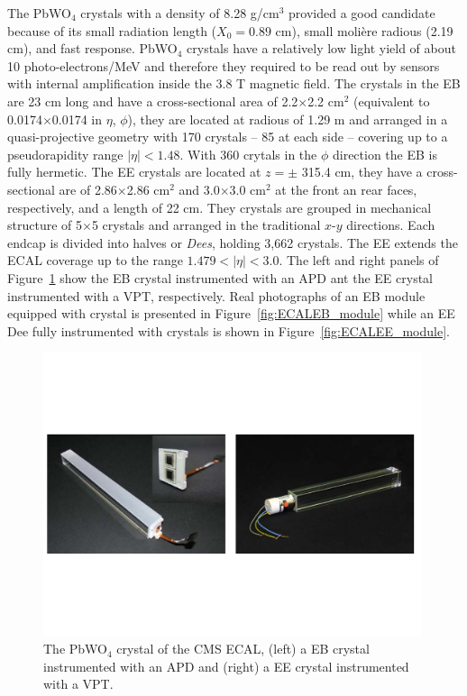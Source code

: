 The PbWO$_{4}$ crystals with a density of 8.28 g/cm$^{3}$ provided a
good candidate because of its small radiation length ($X_{0} = 0.89$
cm), small moli\`ere radious (2.19 cm), and fast response. PbWO$_{4}$
crystals have a relatively low light yield of about 10
photo-electrons/MeV and therefore they required to be read out by
sensors with internal amplification inside the 3.8 T magnetic
field. The crystals in the EB are 23 cm long and have a
cross-sectional area of 2.2$\times$2.2 cm$^{2}$ (equivalent to
0.0174$\times$0.0174 in $\eta$, $\phi$), they are located at radious
of 1.29 m and arranged
in a quasi-projective geometry with 170 crystals -- 85 at each side --  covering up to a pseudorapidity range
$|\eta| < 1.48$. With 360 crytals in the $\phi$  direction the EB is
fully hermetic. The EE crystals are located at $z = \pm$ 315.4 cm, they
have a cross-sectional are of 2.86$\times$2.86 cm$^{2}$  and
3.0$\times$3.0 cm$^{2}$ at the front an rear faces, respectively, and
a length of 22 cm. They crystals are grouped in mechanical structure
of 5$\times$5 crystals and arranged in the traditional $x$-$y$
directions. Each endcap is divided into halves or \textit{Dees},
holding 3,662 crystals. The EE extends the ECAL coverage up to the
range $1.479 < |\eta| < 3.0$. The left and right panels of
Figure~\ref{fig:ECALcrystals} show the EB crystal instrumented with an
APD ant the EE crystal instrumented with a VPT, respectively.  Real
photographs of an EB module equipped with crystal is presented in
Figure~\ref{fig:ECALEB_module} while an EE Dee fully instrumented with crystals is shown
in Figure~\ref{fig:ECALEE_module}.
\begin{figure}
 \centering
\includegraphics[width=0.99\textwidth]{CMS_DetectorFigures/EcalCrytals.pdf}
\caption{The  PbWO$_{4}$ crystal of the CMS ECAL, (left) a EB crystal
  instrumented with an APD and (right) a EE crystal instrumented with a VPT.\label{fig:ECALcrystals}}
\end{figure}
